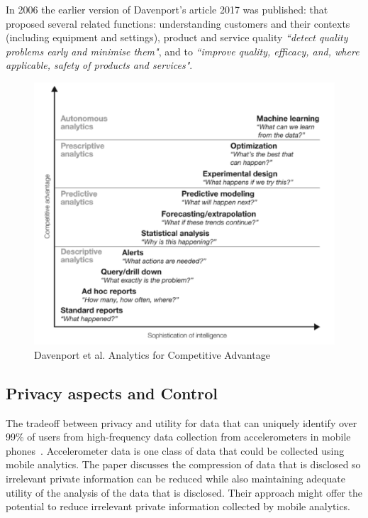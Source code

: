 In 2006 the earlier version of Davenport's article 2017 \cite{davenport2017competing_on_analytics} was published: \cite{davenport2006competing_on_analytics} that proposed several related functions: understanding customers and their contexts (including equipment and settings), product and service quality \emph{``detect quality problems early and minimise them"}, and to \emph{``improve quality, efficacy, and, where applicable, safety of products and services"}.
\begin{figure}
    \centering
    \includegraphics[width=\linewidth]{images/hbr/davenport-et-al-competing-on-analytics-2017-competitive-advantage.png}
    \caption{Davenport et al. Analytics for Competitive Advantage}
    \label{fig:davenport-analytics-for-competitive-advantage}
\end{figure}
\afterpage{\clearpage}

\subsection{Privacy aspects and Control}
The tradeoff between privacy and utility for data that can uniquely identify over 99\% of users from high-frequency data collection from accelerometers in mobile phones~. Accelerometer data is one class of data that could be collected using mobile analytics. The paper discusses the compression of data that is disclosed so irrelevant private information can be reduced while also maintaining adequate utility of the analysis of the data that is disclosed. Their approach might offer the potential to reduce irrelevant private information collected by mobile analytics. %

